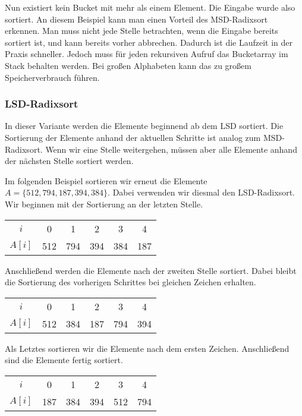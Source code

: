 Nun existiert kein Bucket mit mehr als einem Element. Die Eingabe wurde also sortiert.
An diesem Beispiel kann man einen Vorteil des MSD-Radixsort erkennen.
Man muss nicht jede Stelle betrachten, wenn die Eingabe bereits sortiert ist, und kann bereits vorher abbrechen.
Dadurch ist die Laufzeit in der Praxis schneller.
Jedoch muss für jeden rekursiven Aufruf das Bucketarray im Stack behalten werden.
Bei großen Alphabeten kann das zu großem Speicherverbrauch führen.

\subsubsection{LSD-Radixsort}
\label{sort:radix:lsd}

In dieser Variante werden die Elemente beginnend ab dem LSD sortiert.
Die Sortierung der Elemente anhand der aktuellen Schritte ist analog zum MSD-Radixsort.
Wenn wir eine Stelle weitergehen, müssen aber alle Elemente anhand der nächsten Stelle sortiert werden.

Im folgenden Beispiel sortieren wir erneut die Elemente $A=\{512, 794, 187, 394, 384\}$.
Dabei verwenden wir diesmal den LSD-Radixsort.
Wir beginnen mit der Sortierung an der letzten Stelle.

\begin{table}[H]
	\centering
	\begin{tabular}{c|| c | c c c | c }
		$i$ & 0 & 1 & 2 & 3 & 4 \\
		$A[i]$ & 512 & 794 & 394 & 384 & 187
	\end{tabular}
	\label{tab:radix:lsd:step_1}
\end{table}

Anschließend werden die Elemente nach der zweiten Stelle sortiert.
Dabei bleibt die Sortierung des vorherigen Schrittes bei gleichen Zeichen erhalten.

\begin{table}[H]
	\centering
	\begin{tabular}{c|| c | c | c | c | c }
		$i$ & 0 & 1 & 2 & 3 & 4 \\
		$A[i]$ & 512 & 384 & 187 & 794 & 394
	\end{tabular}
	\label{tab:radix:lsd:step_2}
\end{table}

Als Letztes sortieren wir die Elemente nach dem ersten Zeichen.
Anschließend sind die Elemente fertig sortiert.

\begin{table}[H]
	\centering
	\begin{tabular}{c|| c | c | c | c | c }
		$i$ & 0 & 1 & 2 & 3 & 4 \\
		$A[i]$ & 187 & 384 & 394 & 512 & 794
	\end{tabular}
	\label{tab:radix:lsd:step_3}
\end{table}

